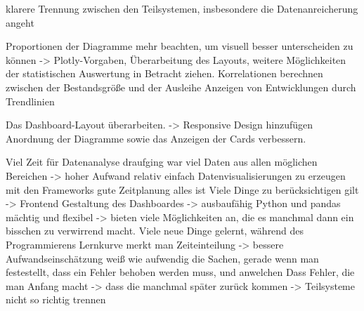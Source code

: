 klarere Trennung zwischen den Teilsystemen, insbesondere die Datenanreicherung angeht

Proportionen der Diagramme mehr beachten, um visuell besser unterscheiden zu können -> Plotly-Vorgaben, Überarbeitung des Layouts,
weitere Möglichkeiten der statistischen Auswertung in Betracht ziehen. Korrelationen berechnen zwischen der Bestandsgröße und der Ausleihe
Anzeigen von Entwicklungen durch Trendlinien 

Das Dashboard-Layout überarbeiten. -> Responsive Design hinzufügen
Anordnung der Diagramme sowie das Anzeigen der Cards verbessern.


Viel Zeit für Datenanalyse draufging
war viel Daten aus allen möglichen Bereichen -> hoher Aufwand
relativ einfach Datenvisualisierungen zu erzeugen mit den Frameworks
gute Zeitplanung alles ist
Viele Dinge zu berücksichtigen gilt -> Frontend Gestaltung des Dashboardes -> ausbaufähig
Python und pandas mächtig und flexibel ->  bieten  viele Möglichkeiten an, die es manchmal 
dann ein bisschen zu verwirrend macht. Viele neue Dinge gelernt, während des Programmierens
Lernkurve merkt man
Zeiteinteilung -> bessere Aufwandseinschätzung weiß wie aufwendig die Sachen, gerade wenn man festestellt,
dass ein Fehler behoben werden muss, und anwelchen
Dass Fehler, die man Anfang macht -> dass die manchmal später zurück kommen -> Teilsysteme nicht so richtig trennen


